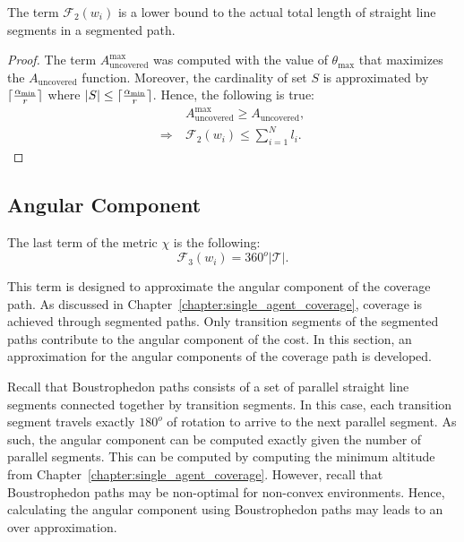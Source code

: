 \documentclass[../main.tex]{subfiles}
\begin{document}
\begin{proposition}
The term $\mathcal{F}_2(w_i)$ is a lower bound to the actual total length of straight line segments in a segmented path.
\end{proposition}
\begin{proof}
The term $A_{\text{uncovered}}^{\max}$ was computed with the value of $\theta_{\max}$ that maximizes the $A_{\text{uncovered}}$ function. Moreover, the cardinality of set $S$ is approximated by $\lceil\frac{\alpha_{\min}}{r}\rceil$ where $|S|\leq\lceil\frac{\alpha_{\min}}{r}\rceil$. Hence, the following is true:
\begin{equation}
\begin{aligned}
	&A_{\text{uncovered}}^{\max}\geq A_{\text{uncovered}},\\
	\Longrightarrow\  &\mathcal{F}_2(w_i)\leq\sum_{i=1}^Nl_i.
	\end{aligned}
\end{equation}
\end{proof}


\subsection{Angular Component}
\label{subsection:angular_component}

The last term of the metric $\chi$ is the following:
\begin{equation}
	\mathcal{F}_3(w_i)=360^o|\mathcal{T}|.
\end{equation}

This term is designed to approximate the angular component of the coverage path. As discussed in Chapter~\ref{chapter:single_agent_coverage}, coverage is achieved through segmented paths. Only transition segments of the segmented paths contribute to the angular component of the cost. In this section, an approximation for the angular components of the coverage path is developed.

\begin{remark}
Recall that Boustrophedon paths consists of a set of parallel straight line segments connected together by transition segments. In this case, each transition segment travels exactly $180^o$ of rotation to arrive to the next parallel segment. As such, the angular component can be computed exactly given the number of parallel segments. This can be computed by computing the minimum altitude from Chapter~\ref{chapter:single_agent_coverage}. However, recall that Boustrophedon paths may be non-optimal for non-convex environments. Hence, calculating the angular component using Boustrophedon paths may leads to an over approximation.\RE
\end{remark}
\end{document}
